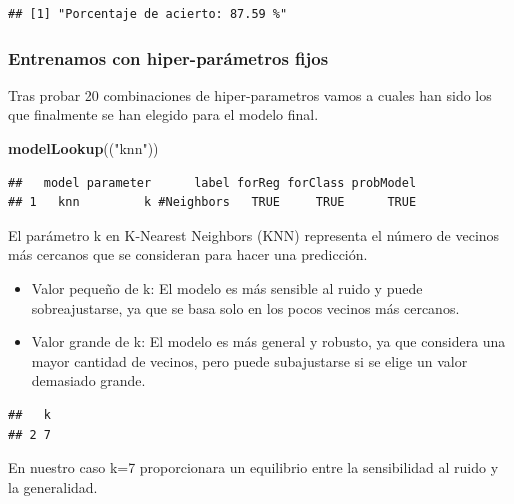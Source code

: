 \documentclass[
]{article}
\newenvironment{Shaded}{\begin{snugshade}}{\end{snugshade}}
\newcommand{\FunctionTok}[1]{\textcolor[rgb]{0.13,0.29,0.53}{\textbf{#1}}}
\newcommand{\NormalTok}[1]{#1}
\newcommand{\SpecialCharTok}[1]{\textcolor[rgb]{0.81,0.36,0.00}{\textbf{#1}}}
\newcommand{\StringTok}[1]{\textcolor[rgb]{0.31,0.60,0.02}{#1}}
\begin{document}
\begin{verbatim}
## [1] "Porcentaje de acierto: 87.59 %"
\end{verbatim}

\hypertarget{entrenamos-con-hiper-paruxe1metros-fijos-2}{%
\subsubsection{Entrenamos con hiper-parámetros
fijos}\label{entrenamos-con-hiper-paruxe1metros-fijos-2}}

Tras probar 20 combinaciones de hiper-parametros vamos a cuales han sido
los que finalmente se han elegido para el modelo final.

\begin{Shaded}
\begin{Highlighting}[]
\FunctionTok{modelLookup}\NormalTok{((}\StringTok{"knn"}\NormalTok{))}
\end{Highlighting}
\end{Shaded}

\begin{verbatim}
##   model parameter      label forReg forClass probModel
## 1   knn         k #Neighbors   TRUE     TRUE      TRUE
\end{verbatim}

El parámetro k en K-Nearest Neighbors (KNN) representa el número de
vecinos más cercanos que se consideran para hacer una predicción.

\begin{itemize}
\item
  Valor pequeño de k: El modelo es más sensible al ruido y puede
  sobreajustarse, ya que se basa solo en los pocos vecinos más cercanos.
\item
  Valor grande de k: El modelo es más general y robusto, ya que
  considera una mayor cantidad de vecinos, pero puede subajustarse si se
  elige un valor demasiado grande.
\end{itemize}

\begin{Shaded}
\end{Shaded}

\begin{verbatim}
##   k
## 2 7
\end{verbatim}

En nuestro caso k=7 proporcionara un equilibrio entre la sensibilidad al
ruido y la generalidad.
\end{document}
